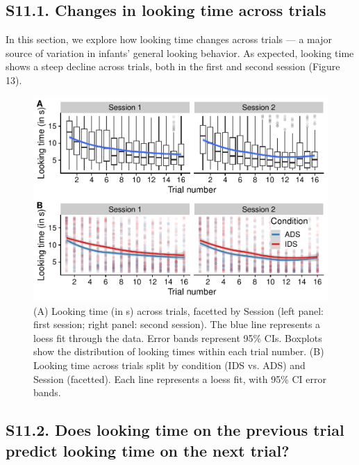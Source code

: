 \documentclass[
  man, donotrepeattitle,floatsintext]{apa6}
\begin{document}
\hypertarget{s11.1.-changes-in-looking-time-across-trials}{%
\subsection{S11.1. Changes in looking time across trials}\label{s11.1.-changes-in-looking-time-across-trials}}

In this section, we explore how looking time changes across trials --- a major source of variation in infants' general looking behavior.
As expected, looking time shows a steep decline across trials, both in the first and second session (Figure 13).

\begin{figure}

{\centering \includegraphics{MB1T_supplement_files/figure-latex/fig13-1} 

}

\caption{(A) Looking time (in s) across trials, facetted by Session (left panel: first session; right panel: second session). The blue line represents a loess fit through the data. Error bands represent 95\% CIs. Boxplots show the distribution of looking times within each trial number. (B) Looking time across trials split by condition (IDS vs. ADS) and Session (facetted). Each line represents a loess fit, with 95\% CI error bands.}\label{fig:fig13}
\end{figure}

\hypertarget{s11.2.-does-looking-time-on-the-previous-trial-predict-looking-time-on-the-next-trial}{%
\subsection{S11.2. Does looking time on the previous trial predict looking time on the next trial?}\label{s11.2.-does-looking-time-on-the-previous-trial-predict-looking-time-on-the-next-trial}}
\end{document}
